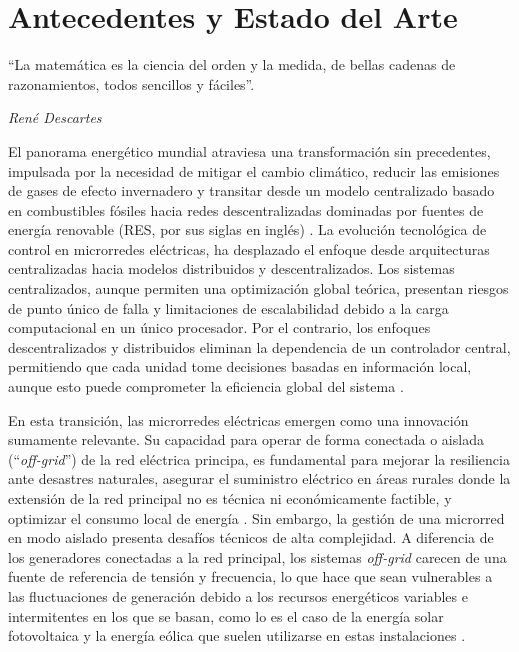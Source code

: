 \cleardoublepage                                  %
\chapter{Antecedentes y Estado del Arte}

\epigraph{“La matemática es la ciencia del orden y la medida, de bellas cadenas de razonamientos, todos sencillos y fáciles”.}{\textit{René Descartes}}

El panorama energético mundial atraviesa una transformación sin precedentes, impulsada por la necesidad de mitigar el cambio climático, reducir las emisiones de gases de efecto invernadero y transitar desde un modelo centralizado basado en combustibles fósiles hacia redes descentralizadas dominadas por fuentes de energía renovable (RES, por sus siglas en inglés) \cite{muqeet2021energy}. La evolución tecnológica de control en microrredes eléctricas, ha desplazado el enfoque desde arquitecturas centralizadas hacia modelos distribuidos y descentralizados. Los sistemas centralizados, aunque permiten una optimización global teórica, presentan riesgos de punto único de falla y limitaciones de escalabilidad debido a la carga computacional en un único procesador. Por el contrario, los enfoques descentralizados y distribuidos eliminan la dependencia de un controlador central, permitiendo que cada unidad tome decisiones basadas en información local, aunque esto puede comprometer la eficiencia global del sistema \cite{pamulapati2023review}.

En esta transición, las microrredes eléctricas emergen como una innovación sumamente relevante. Su capacidad para operar de forma conectada o aislada (``\textit{off-grid}'') de la red eléctrica principa, es fundamental para mejorar la resiliencia ante desastres naturales, asegurar el suministro eléctrico en áreas rurales donde la extensión de la red principal no es técnica ni económicamente factible, y optimizar el consumo local de energía \cite{ibekwe2024microgrid}. Sin embargo, la gestión de una microrred en modo aislado presenta desafíos técnicos de alta complejidad. A diferencia de los generadores conectadas a la red principal, los sistemas \textit{off-grid} carecen de una fuente de referencia de tensión y frecuencia, lo que hace que sean vulnerables a las fluctuaciones de generación debido a los recursos energéticos variables e intermitentes en los que se basan, como lo es el caso de la energía solar fotovoltaica y la energía eólica que suelen utilizarse en estas instalaciones \cite{chae2014isolated}. 

